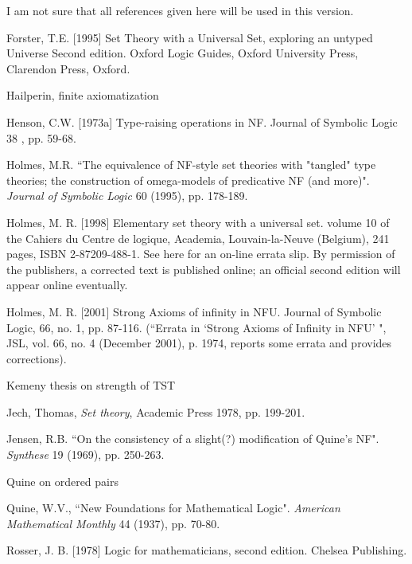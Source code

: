 \documentclass[112pt]{article}
\begin{document}
\newpage

I am not sure that all references given here will be used in this version.

\begin{thebibliography}{99}





  Forster, T.E. [1995] 
Set Theory with a Universal Set, exploring an untyped Universe 
Second edition. Oxford Logic Guides, Oxford University Press, Clarendon Press, Oxford.

 Hailperin, finite axiomatization

   Henson, C.W. [1973a] 
Type-raising operations in NF. 
Journal of Symbolic Logic 38 , pp. 59-68.

  Holmes, M.R.
``The equivalence of NF-style set theories with "tangled" type theories; the construction of omega-models of predicative NF (and more)". 
{\em Journal of Symbolic Logic\/} 60 (1995), pp. 178-189.

  Holmes, M. R. [1998] 
Elementary set theory with a universal set. 
volume 10 of the Cahiers du Centre de logique, Academia, Louvain-la-Neuve (Belgium), 241 pages, ISBN 2-87209-488-1. See here for an on-line errata slip. By permission of the publishers, a corrected text is published online; an official second edition will appear online eventually.

   Holmes, M. R. [2001]
Strong Axioms of infinity in NFU.
Journal of Symbolic Logic, 66, no. 1, pp. 87-116.  \newline(``Errata in `Strong
Axioms of Infinity in NFU' ", JSL, vol. 66, no. 4 (December
2001), p. 1974, reports some errata and provides corrections).

  Kemeny thesis on strength of TST

  Jech, Thomas, {\em Set theory}, Academic Press 1978, pp. 199-201.

  Jensen, R.B.
``On the consistency of a slight(?) modification of Quine's NF". 
{\em Synthese\/} 19 (1969), pp. 250-263.

  Quine on ordered pairs

  Quine, W.V.,
``New Foundations for Mathematical Logic". 
{\em American Mathematical Monthly\/} 44 (1937), pp. 70-80. 

  Rosser, J. B. [1978] 
Logic for mathematicians, second edition. 
Chelsea Publishing.


\end{thebibliography}
\end{document}
